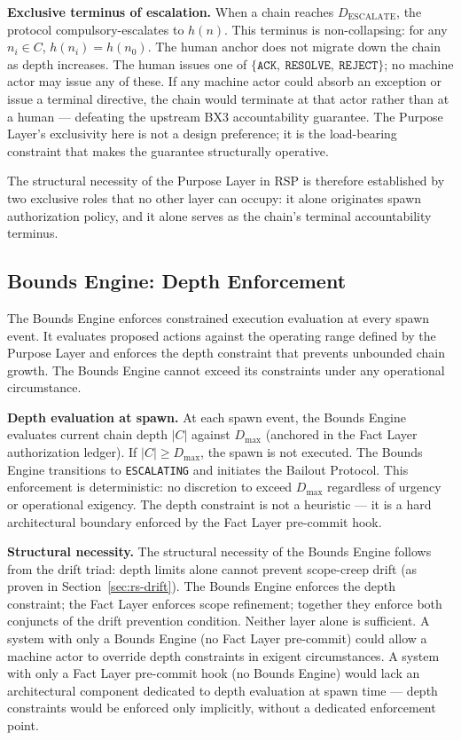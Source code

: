 \medskip
\noindent\textbf{Exclusive terminus of escalation.} When a chain reaches $D_{\mathrm{ESCALATE}}$, the protocol compulsory-escalates to $h(n)$. This terminus is non-collapsing: for any $n_i \in C$, $h(n_i) = h(n_0)$. The human anchor does not migrate down the chain as depth increases. The human issues one of $\{\texttt{ACK},\ \texttt{RESOLVE},\ \texttt{REJECT}\}$; no machine actor may issue any of these. If any machine actor could absorb an exception or issue a terminal directive, the chain would terminate at that actor rather than at a human — defeating the upstream BX3 accountability guarantee. The Purpose Layer's exclusivity here is not a design preference; it is the load-bearing constraint that makes the guarantee structurally operative.

The structural necessity of the Purpose Layer in RSP is therefore established by two exclusive roles that no other layer can occupy: it alone originates spawn authorization policy, and it alone serves as the chain's terminal accountability terminus.

\subsection{Bounds Engine: Depth Enforcement}
\label{sec:rs-bounds}

The Bounds Engine enforces constrained execution evaluation at every spawn event. It evaluates proposed actions against the operating range defined by the Purpose Layer and enforces the depth constraint that prevents unbounded chain growth. The Bounds Engine cannot exceed its constraints under any operational circumstance.

\medskip
\noindent\textbf{Depth evaluation at spawn.} At each spawn event, the Bounds Engine evaluates current chain depth $|C|$ against $D_{\mathrm{max}}$ (anchored in the Fact Layer authorization ledger). If $|C| \geq D_{\mathrm{max}}$, the spawn is not executed. The Bounds Engine transitions to \texttt{ESCALATING} and initiates the Bailout Protocol. This enforcement is deterministic: no discretion to exceed $D_{\mathrm{max}}$ regardless of urgency or operational exigency. The depth constraint is not a heuristic — it is a hard architectural boundary enforced by the Fact Layer pre-commit hook.

\medskip
\noindent\textbf{Structural necessity.} The structural necessity of the Bounds Engine follows from the drift triad: depth limits alone cannot prevent scope-creep drift (as proven in Section~\ref{sec:rs-drift}). The Bounds Engine enforces the depth constraint; the Fact Layer enforces scope refinement; together they enforce both conjuncts of the drift prevention condition. Neither layer alone is sufficient. A system with only a Bounds Engine (no Fact Layer pre-commit) could allow a machine actor to override depth constraints in exigent circumstances. A system with only a Fact Layer pre-commit hook (no Bounds Engine) would lack an architectural component dedicated to depth evaluation at spawn time — depth constraints would be enforced only implicitly, without a dedicated enforcement point.

